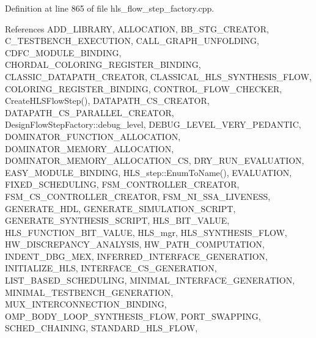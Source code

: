 Definition at line 865 of file hls\+\_\+flow\+\_\+step\+\_\+factory.\+cpp.



References A\+D\+D\+\_\+\+L\+I\+B\+R\+A\+RY, A\+L\+L\+O\+C\+A\+T\+I\+ON, B\+B\+\_\+\+S\+T\+G\+\_\+\+C\+R\+E\+A\+T\+OR, C\+\_\+\+T\+E\+S\+T\+B\+E\+N\+C\+H\+\_\+\+E\+X\+E\+C\+U\+T\+I\+ON, C\+A\+L\+L\+\_\+\+G\+R\+A\+P\+H\+\_\+\+U\+N\+F\+O\+L\+D\+I\+NG, C\+D\+F\+C\+\_\+\+M\+O\+D\+U\+L\+E\+\_\+\+B\+I\+N\+D\+I\+NG, C\+H\+O\+R\+D\+A\+L\+\_\+\+C\+O\+L\+O\+R\+I\+N\+G\+\_\+\+R\+E\+G\+I\+S\+T\+E\+R\+\_\+\+B\+I\+N\+D\+I\+NG, C\+L\+A\+S\+S\+I\+C\+\_\+\+D\+A\+T\+A\+P\+A\+T\+H\+\_\+\+C\+R\+E\+A\+T\+OR, C\+L\+A\+S\+S\+I\+C\+A\+L\+\_\+\+H\+L\+S\+\_\+\+S\+Y\+N\+T\+H\+E\+S\+I\+S\+\_\+\+F\+L\+OW, C\+O\+L\+O\+R\+I\+N\+G\+\_\+\+R\+E\+G\+I\+S\+T\+E\+R\+\_\+\+B\+I\+N\+D\+I\+NG, C\+O\+N\+T\+R\+O\+L\+\_\+\+F\+L\+O\+W\+\_\+\+C\+H\+E\+C\+K\+ER, Create\+H\+L\+S\+Flow\+Step(), D\+A\+T\+A\+P\+A\+T\+H\+\_\+\+C\+S\+\_\+\+C\+R\+E\+A\+T\+OR, D\+A\+T\+A\+P\+A\+T\+H\+\_\+\+C\+S\+\_\+\+P\+A\+R\+A\+L\+L\+E\+L\+\_\+\+C\+R\+E\+A\+T\+OR, Design\+Flow\+Step\+Factory\+::debug\+\_\+level, D\+E\+B\+U\+G\+\_\+\+L\+E\+V\+E\+L\+\_\+\+V\+E\+R\+Y\+\_\+\+P\+E\+D\+A\+N\+T\+IC, D\+O\+M\+I\+N\+A\+T\+O\+R\+\_\+\+F\+U\+N\+C\+T\+I\+O\+N\+\_\+\+A\+L\+L\+O\+C\+A\+T\+I\+ON, D\+O\+M\+I\+N\+A\+T\+O\+R\+\_\+\+M\+E\+M\+O\+R\+Y\+\_\+\+A\+L\+L\+O\+C\+A\+T\+I\+ON, D\+O\+M\+I\+N\+A\+T\+O\+R\+\_\+\+M\+E\+M\+O\+R\+Y\+\_\+\+A\+L\+L\+O\+C\+A\+T\+I\+O\+N\+\_\+\+CS, D\+R\+Y\+\_\+\+R\+U\+N\+\_\+\+E\+V\+A\+L\+U\+A\+T\+I\+ON, E\+A\+S\+Y\+\_\+\+M\+O\+D\+U\+L\+E\+\_\+\+B\+I\+N\+D\+I\+NG, H\+L\+S\+\_\+step\+::\+Enum\+To\+Name(), E\+V\+A\+L\+U\+A\+T\+I\+ON, F\+I\+X\+E\+D\+\_\+\+S\+C\+H\+E\+D\+U\+L\+I\+NG, F\+S\+M\+\_\+\+C\+O\+N\+T\+R\+O\+L\+L\+E\+R\+\_\+\+C\+R\+E\+A\+T\+OR, F\+S\+M\+\_\+\+C\+S\+\_\+\+C\+O\+N\+T\+R\+O\+L\+L\+E\+R\+\_\+\+C\+R\+E\+A\+T\+OR, F\+S\+M\+\_\+\+N\+I\+\_\+\+S\+S\+A\+\_\+\+L\+I\+V\+E\+N\+E\+SS, G\+E\+N\+E\+R\+A\+T\+E\+\_\+\+H\+DL, G\+E\+N\+E\+R\+A\+T\+E\+\_\+\+S\+I\+M\+U\+L\+A\+T\+I\+O\+N\+\_\+\+S\+C\+R\+I\+PT, G\+E\+N\+E\+R\+A\+T\+E\+\_\+\+S\+Y\+N\+T\+H\+E\+S\+I\+S\+\_\+\+S\+C\+R\+I\+PT, H\+L\+S\+\_\+\+B\+I\+T\+\_\+\+V\+A\+L\+UE, H\+L\+S\+\_\+\+F\+U\+N\+C\+T\+I\+O\+N\+\_\+\+B\+I\+T\+\_\+\+V\+A\+L\+UE, H\+L\+S\+\_\+mgr, H\+L\+S\+\_\+\+S\+Y\+N\+T\+H\+E\+S\+I\+S\+\_\+\+F\+L\+OW, H\+W\+\_\+\+D\+I\+S\+C\+R\+E\+P\+A\+N\+C\+Y\+\_\+\+A\+N\+A\+L\+Y\+S\+IS, H\+W\+\_\+\+P\+A\+T\+H\+\_\+\+C\+O\+M\+P\+U\+T\+A\+T\+I\+ON, I\+N\+D\+E\+N\+T\+\_\+\+D\+B\+G\+\_\+\+M\+EX, I\+N\+F\+E\+R\+R\+E\+D\+\_\+\+I\+N\+T\+E\+R\+F\+A\+C\+E\+\_\+\+G\+E\+N\+E\+R\+A\+T\+I\+ON, I\+N\+I\+T\+I\+A\+L\+I\+Z\+E\+\_\+\+H\+LS, I\+N\+T\+E\+R\+F\+A\+C\+E\+\_\+\+C\+S\+\_\+\+G\+E\+N\+E\+R\+A\+T\+I\+ON, L\+I\+S\+T\+\_\+\+B\+A\+S\+E\+D\+\_\+\+S\+C\+H\+E\+D\+U\+L\+I\+NG, M\+I\+N\+I\+M\+A\+L\+\_\+\+I\+N\+T\+E\+R\+F\+A\+C\+E\+\_\+\+G\+E\+N\+E\+R\+A\+T\+I\+ON, M\+I\+N\+I\+M\+A\+L\+\_\+\+T\+E\+S\+T\+B\+E\+N\+C\+H\+\_\+\+G\+E\+N\+E\+R\+A\+T\+I\+ON, M\+U\+X\+\_\+\+I\+N\+T\+E\+R\+C\+O\+N\+N\+E\+C\+T\+I\+O\+N\+\_\+\+B\+I\+N\+D\+I\+NG, O\+M\+P\+\_\+\+B\+O\+D\+Y\+\_\+\+L\+O\+O\+P\+\_\+\+S\+Y\+N\+T\+H\+E\+S\+I\+S\+\_\+\+F\+L\+OW, P\+O\+R\+T\+\_\+\+S\+W\+A\+P\+P\+I\+NG, S\+C\+H\+E\+D\+\_\+\+C\+H\+A\+I\+N\+I\+NG, S\+T\+A\+N\+D\+A\+R\+D\+\_\+\+H\+L\+S\+\_\+\+F\+L\+OW, 